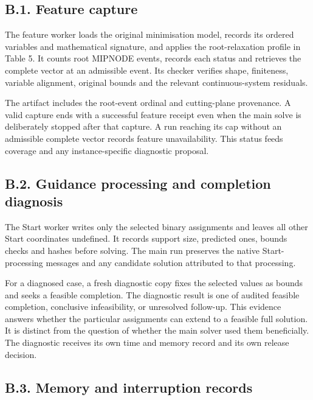 \documentclass[
  british,
  10pt,
]{article}
\begin{document}
\subsection{B.1. Feature capture}\label{b.1.-feature-capture}

The feature worker loads the original minimisation model, records its
ordered variables and mathematical signature, and applies the
root-relaxation profile in Table 5. It counts root MIPNODE events,
records each status and retrieves the complete vector at an admissible
event. Its checker verifies shape, finiteness, variable alignment,
original bounds and the relevant continuous-system residuals.

The artifact includes the root-event ordinal and cutting-plane
provenance. A valid capture ends with a successful feature receipt even
when the main solve is deliberately stopped after that capture. A run
reaching its cap without an admissible complete vector records feature
unavailability. This status feeds coverage and any instance-specific
diagnostic proposal.

\subsection{B.2. Guidance processing and completion
diagnosis}\label{b.2.-guidance-processing-and-completion-diagnosis}

The Start worker writes only the selected binary assignments and leaves
all other Start coordinates undefined. It records support size,
predicted ones, bounds checks and hashes before solving. The main run
preserves the native Start-processing messages and any candidate
solution attributed to that processing.

For a diagnosed case, a fresh diagnostic copy fixes the selected values
as bounds and seeks a feasible completion. The diagnostic result is one
of audited feasible completion, conclusive infeasibility, or unresolved
follow-up. This evidence answers whether the particular assignments can
extend to a feasible full solution. It is distinct from the question of
whether the main solver used them beneficially. The diagnostic receives
its own time and memory record and its own release decision.

\subsection{B.3. Memory and interruption
records}\label{b.3.-memory-and-interruption-records}
\end{document}
